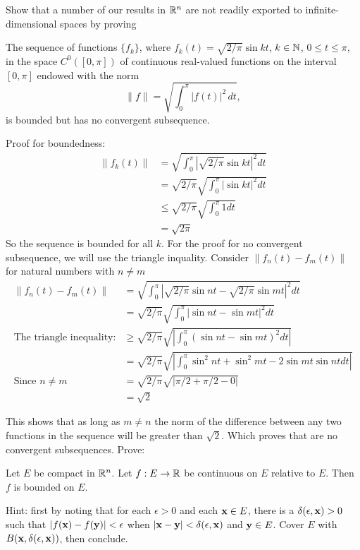 \medskip

\noindent
Show that a number of our results in $\mathbb{R}^n$ are not readily exported to infinite-dimensional spaces by proving
\begin{prop}%
The sequence of functions $\{ f_k \}$, where $f_k (t) = \sqrt{2/\pi} \sin k t$, $k \in \mathbb{N}$, $0 \leq t \leq \pi$, in the space $C^0([0,\pi])$ of continuous real-valued functions on the interval $[0,\pi]$ endowed with the norm
\begin{equation*}
  \| f \| = \sqrt{\int_0^\pi |f(t)|^2 \, dt},
\end{equation*}
is bounded but has no convergent subsequence.
\end{prop}

Proof for boundedness:
\begin{align*}
  \| f_k(t) \| &= \sqrt{\int_0^\pi |\sqrt{2/\pi} \sin k t|^2 dt}\\
               &= \sqrt{2/\pi} \sqrt{\int_0^\pi |\sin k t|^2 dt}\\
               &\leq \sqrt{2/\pi} \sqrt{\int_0^\pi 1 dt}\\
               &= \sqrt{2\pi}
\end{align*}
So the sequence is bounded for all $k$. For the proof for no convergent subsequence, we will use the triangle inquality.
Consider $\| f_n(t) - f_m(t)\|$ for natural numbers with $n \neq m$
\begin{align*}
\|f_n(t) - f_m(t)\|              &= \sqrt{\int_0^\pi | \sqrt{2/\pi} \sin n t - \sqrt{2/\pi} \sin m t |^2 dt}\\
                                 &= \sqrt{2/\pi} \sqrt{\int_0^\pi | \sin n t - \sin m t |^2 dt}\\
\textrm{The triangle inequality:}&\geq \sqrt{2/\pi} \sqrt{| \int_0^\pi (\sin n t - \sin m t)^2 dt |}\\
                                 &= \sqrt{2/\pi} \sqrt{| \int_0^\pi \sin^2 n t + \sin^2 m t - 2\sin mt\sin nt dt |}\\
\textrm{Since $n \neq m$}        &= \sqrt{2/\pi} \sqrt{| \pi/2 + \pi/2 - 0 |}\\
                                 &= \sqrt{2}
\end{align*}

This shows that as long as $m \neq n$ the norm of the difference between any two functions in the sequence will be
greater than $\sqrt{2}$. Which proves that are no convergent subsequences.
\noindent
Prove:
\begin{prop}
Let $E$ be compact in $\mathbb{R}^n$.  Let $f : E \to \mathbb{R}$ be continuous on $E$ relative to $E$.  Then $f$ is bounded on $E$.
\end{prop}
\noindent
Hint: first by noting that for each $\epsilon > 0$ and each $\mathbf{x} \in E$, there is a $\delta(\epsilon,\mathbf{x}) > 0$ such that $|f(\mathbf{x}) - f(\mathbf{y})| < \epsilon$ when $|\mathbf{x} - \mathbf{y}| < \delta (\epsilon,\mathbf{x})$ and $\mathbf{y} \in E$.  Cover $E$ with $B(\mathbf{x},\delta(\epsilon,\mathbf{x}))$, then conclude.

